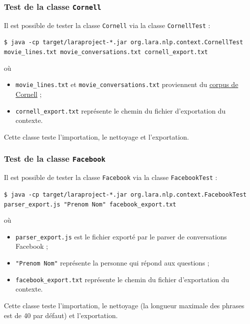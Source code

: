\documentclass[10pt,a4paper]{article}
\begin{document}
\subsubsection{Test de la classe \texttt{Cornell}}
Il est possible de tester la classe \texttt{Cornell} via la classe \texttt{CornellTest} :
\begin{center}
	\texttt{\$ java -cp target/laraproject-*.jar org.lara.nlp.context.CornellTest movie\_lines.txt movie\_conversations.txt cornell\_export.txt}
\end{center}
où
\begin{itemize}
	\item \texttt{movie\_lines.txt} et \texttt{movie\_conversations.txt} proviennent du \href{https://www.cs.cornell.edu/~cristian/Cornell_Movie-Dialogs_Corpus.html}{corpus de Cornell} ;
	\item \texttt{cornell\_export.txt} représente le chemin du fichier d'exportation du contexte.
\end{itemize}
Cette classe teste l'importation, le nettoyage et l'exportation.
\subsubsection{Test de la classe \texttt{Facebook}}
Il est possible de tester la classe \texttt{Facebook} via la classe \texttt{FacebookTest} :
\begin{center}
	\texttt{\$ java -cp target/laraproject-*.jar org.lara.nlp.context.FacebookTest parser\_export.js "Prenom Nom" facebook\_export.txt}
\end{center}
où
\begin{itemize}
	\item \texttt{parser\_export.js} est le fichier exporté par le parser de conversations Facebook ;
	\item \texttt{"Prenom Nom"} représente la personne qui répond aux questions ;
	\item \texttt{facebook\_export.txt} représente le chemin du fichier d'exportation du contexte.
\end{itemize}
Cette classe teste l'importation, le nettoyage (la longueur maximale des phrases est de 40 par défaut) et l'exportation.
\end{document}
